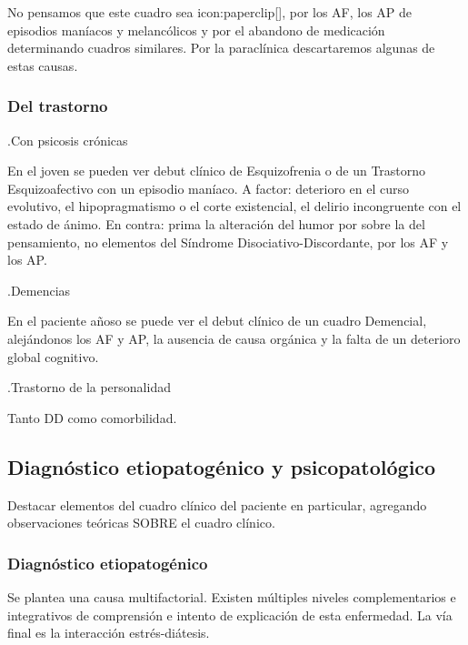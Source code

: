 No pensamos que este cuadro sea icon:paperclip[], por los AF, los AP de episodios maníacos y melancólicos y por el abandono de medicación determinando cuadros similares. Por la paraclínica descartaremos algunas de estas causas.
\subsubsection*{Del trastorno}
.Con psicosis crónicas

En el joven se pueden ver debut clínico de Esquizofrenia o de un Trastorno Esquizoafectivo con un episodio maníaco. A factor: deterioro en el curso evolutivo, el hipopragmatismo o el corte existencial, el delirio incongruente con el estado de ánimo. En contra: prima la alteración del humor por sobre la del pensamiento, no elementos del Síndrome Disociativo-Discordante, por los AF y los AP.

.Demencias

En el paciente añoso se puede ver el debut clínico de un cuadro Demencial, alejándonos los AF y AP, la ausencia de causa orgánica y la falta de un deterioro global cognitivo.

.Trastorno de la personalidad

Tanto DD como comorbilidad.
\subsection*{Diagnóstico etiopatogénico y psicopatológico}
Destacar elementos del cuadro clínico del paciente en particular, agregando observaciones teóricas SOBRE el cuadro clínico.
\subsubsection*{Diagnóstico etiopatogénico}
Se plantea una causa multifactorial. Existen múltiples niveles complementarios e integrativos de comprensión e intento de explicación de esta enfermedad. La vía final es la interacción estrés-diátesis.
